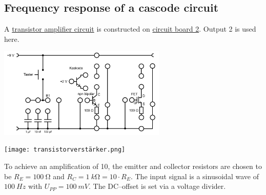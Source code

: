 \documentclass[a4paper,10pt]{article}
\newenvironment{Figure}
  {\par\medskip\noindent\minipage{\linewidth}}
  {\endminipage\par\medskip} %
\numberwithin{equation}{section}
\begin{document}
\begin{multicols}{2}
        \subsection{Frequency response of a cascode circuit}
        A \hyperref[fig:transistorverstärker]{transistor amplifier circuit} is constructed on \hyperref[fig:schaltbrett_2]{circuit board 2}.
        Output 2 is used here.
        \begin{Figure}
                \centering
                \includegraphics[width=0.6\textwidth]{schaltbrett_2.png}
                 \label{fig:schaltbrett_2}
        \end{Figure}
        \begin{Figure}
                \centering
                \texttt{[image: transistorverstärker.png]}
                 \label{fig:transistorverstärker}
        \end{Figure}
        To achieve an amplification of 10, the emitter and collector resistors are chosen to be $R_E=\SI{100}{\ohm}$ and $R_C=\SI{1}{k\ohm}=10\cdot R_E$.
        The input signal is a sinusoidal wave of $\SI{100}{Hz}$ with $U_{PP}=\SI{100}{mV}$.
        The DC--offset is set via a voltage divider.

\end{multicols}

\clearpage
\listoffigures
\listoftables



\end{document}
